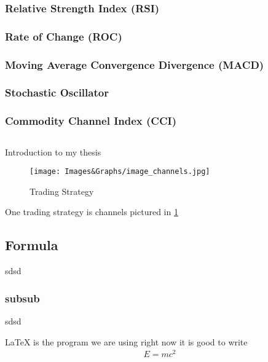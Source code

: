 \documentclass[a4paper,12pt]{report}
\begin{document}
			\subsubsection{Relative Strength Index (RSI)}
			\subsubsection{Rate of Change (ROC)}
			\subsubsection{Moving Average Convergence Divergence (MACD)}
			\subsubsection{Stochastic Oscillator}
			\subsubsection{Commodity Channel Index (CCI)}

		\subsection{}







Introduction to my thesis
\begin{figure}[h]
\begin{center}
\texttt{[image: Images\&Graphs/image\_channels.jpg]}
\caption{Trading Strategy}
\label{trading_strategy}
\end{center}
\end{figure}

One trading strategy is channels pictured in \ref{trading_strategy}

\subsection{Formula}
sdsd 
\subsubsection{subsub}
sdsd

\LaTeX{} is the program we are using right now
it is good to write 
\begin{align}
E=mc^2
\end{align}
\end{document}
